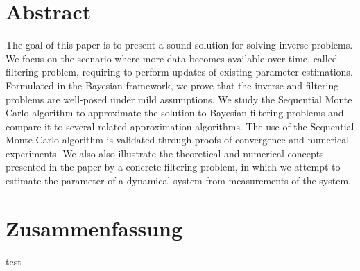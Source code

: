 \thispagestyle{plain}

\section*{Abstract}

The goal of this paper is to present a sound solution for solving inverse problems. We focus on the scenario where more data becomes available over time, called filtering problem, requiring to perform updates of existing parameter estimations. Formulated in the Bayesian framework, we prove that the inverse and filtering problems are well-posed under mild assumptions. We study the Sequential Monte Carlo algorithm to approximate the solution to Bayesian filtering problems and compare it to several related approximation algorithms. The use of the Sequential Monte Carlo algorithm is validated through proofs of convergence and numerical experiments. We also also illustrate the theoretical and numerical concepts presented in the paper by a concrete filtering problem, in which we attempt to estimate the parameter of a dynamical system from measurements of the system.

\section*{Zusammenfassung}

test

